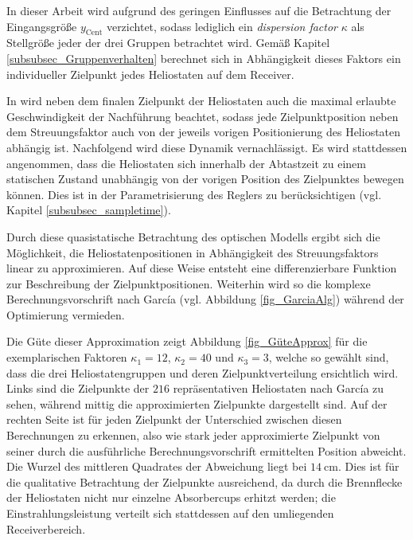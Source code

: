 In dieser Arbeit wird aufgrund des geringen Einflusses auf die Betrachtung der Eingangsgröße $y_{\mathrm{Cent}}$ verzichtet, sodass lediglich ein \textit{dispersion factor} $\kappa$ als Stellgröße jeder der drei Gruppen betrachtet wird.
Gemäß Kapitel \ref{subsubsec_Gruppenverhalten} berechnet sich in Abhängigkeit dieses Faktors ein individueller Zielpunkt jedes Heliostaten auf dem Receiver.

In \cite{Garcia2} wird neben dem finalen Zielpunkt der Heliostaten auch die maximal erlaubte Geschwindigkeit der Nachführung beachtet, sodass jede Zielpunktposition neben dem Streuungsfaktor auch von der jeweils vorigen Positionierung des Heliostaten abhängig ist.
Nachfolgend wird diese Dynamik vernachlässigt.
Es wird stattdessen angenommen, dass die Heliostaten sich innerhalb der Abtastzeit zu einem statischen Zustand unabhängig von der vorigen Position des Zielpunktes bewegen können.
Dies ist in der Parametrisierung des Reglers zu berücksichtigen (vgl. Kapitel \ref{subsubsec_sampletime}).

Durch diese quasistatische Betrachtung des optischen Modells ergibt sich die Möglichkeit, die Heliostatenpositionen in Abhängigkeit des Streuungsfaktors linear zu approximieren.
Auf diese Weise entsteht eine differenzierbare Funktion zur Beschreibung der Zielpunktpositionen.
Weiterhin wird so die komplexe Berechnungsvorschrift nach García (vgl. Abbildung \ref{fig_GarciaAlg}) während der Optimierung vermieden.

Die Güte dieser Approximation zeigt Abbildung \ref{fig_GüteApprox} für die exemplarischen Faktoren $\kappa_1 = 12$, $\kappa_2 = 40$ und $\kappa_3 = 3$, welche so gewählt sind, dass die drei Heliostatengruppen und deren Zielpunktverteilung ersichtlich wird.
Links sind die Zielpunkte der $216$ repräsentativen Heliostaten nach García zu sehen, während mittig die approximierten Zielpunkte dargestellt sind.
Auf der rechten Seite ist für jeden Zielpunkt der Unterschied zwischen diesen Berechnungen zu erkennen, also wie stark jeder approximierte Zielpunkt von seiner durch die ausführliche Berechnungsvorschrift ermittelten Position abweicht.
Die Wurzel des mittleren Quadrates der Abweichung liegt bei $\SI{14}{\centi\metre}$.
Dies ist für die qualitative Betrachtung der Zielpunkte ausreichend, da durch die Brennflecke der Heliostaten nicht nur einzelne Absorbercups erhitzt werden; die Einstrahlungsleistung verteilt sich stattdessen auf den umliegenden Receiverbereich.

